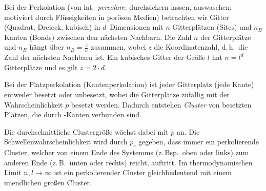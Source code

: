 
\NewDocumentCommand{}
\date{Ausgabe: Fr, 28.06.2019, Besprechung: Fr, 05.07.2019}
\setcounter{question}{18}


\maketitle

Bei der Perkolation (von lat.\ \textit{percolare}: durchsickern lassen, auswaschen; motiviert durch Flüssigkeiten in porösen Medien) betrachten wir Gitter (Quadrat, Dreieck, kubisch) in $d$~Dimensionen mit $n$ Gitterplätzen (Sites) und $n_{B}$ Kanten (Bonds) zwischen den nächsten Nachbarn.
Die Zahl $n$ der Gitterplätze und $n_{B}$ hängt über $n_{B} = \frac{z}{n}$ zusammen, wobei $z$ die Koordinatenzahl, d.\,h.\ die Zahl der nächsten Nachbarn ist.
Ein kubisches Gitter der Größe $l$ hat $n = l^d$ Gitterplätze und es gilt $z = 2·d$.

Bei der Platzperkolation (Kantenperkolation) ist jeder Gitterplatz (jede Kante) entweder besetzt oder unbesetzt, wobei die Gitterplätze zufällig mit der Wahrscheinlichkeit $p$ besetzt werden.
Dadurch entstehen \textit{Cluster} von besetzten Plätzen, die durch -Kanten verbunden sind.

Die durchschnittliche Clustergröße wächst dabei mit $p$ an.
Die Schwellenwahrscheinlichkeit wird durch $p_c$ gegeben, dass immer ein perkolierende Cluster, welcher von einem Ende des Systemms (z.\,Bsp.\ oben oder links) zum anderen Ende (z.\,B.\ unten oder rechts) reicht, auftritt.
Im thermodynamischen Limit $n, l → ∞$ ist ein perkolierender Cluster gleichbedeutend mit einem unendlichen großen Cluster.

